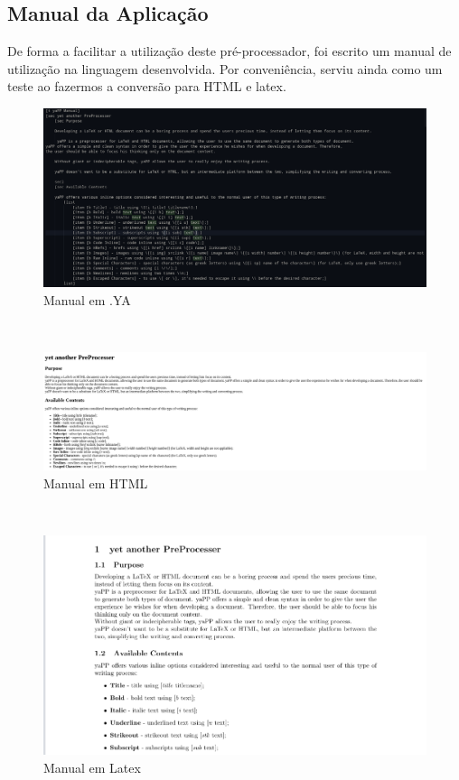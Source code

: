 \documentclass{article}
\begin{document}
 \subsection{Manual da Aplicação}
De forma a facilitar a utilização deste pré-processador, foi escrito um manual de utilização na linguagem desenvolvida. Por conveniência, serviu ainda como um teste ao fazermos a conversão para HTML e latex.\\
 
\begin{figure}[!ht]
\centering
\includegraphics[width=\textwidth]{images/manualYA.png}
\caption{Manual em .YA}
\end{figure}
\\
 
\begin{figure}[!ht]
\centering
\includegraphics[width=\textwidth]{images/manualHTML.png}
\caption{Manual em HTML}
\end{figure}
\\
 
\begin{figure}[!ht]
\centering
\includegraphics[width=\textwidth]{images/manualTEX.png}
\caption{Manual em Latex}
\end{figure}
\end{document}
